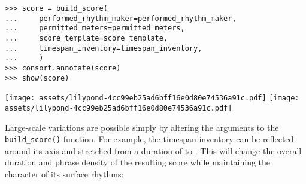 \begin{abjadbookoutput}
\begin{singlespacing}
\vspace{-0.5\baselineskip}
\begin{verbatim}
>>> score = build_score(
...     performed_rhythm_maker=performed_rhythm_maker,
...     permitted_meters=permitted_meters,
...     score_template=score_template,
...     timespan_inventory=timespan_inventory,
...     )
>>> consort.annotate(score)
>>> show(score)
\end{verbatim}
\noindent\texttt{[image: assets/lilypond-4cc99eb25ad6bff16e0d80e74536a91c.pdf]}
\newline
\newline
\noindent\texttt{[image: assets/lilypond-4cc99eb25ad6bff16e0d80e74536a91c.pdf]}
\end{singlespacing}
\end{abjadbookoutput}

\noindent Large-scale variations are possible simply by altering the arguments
to the \texttt{build\_score()} function. For example, the timespan inventory
can be reflected around its axis and stretched from a duration of 
to . This will change the overall duration and phrase density of
the resulting score while maintaining the character of its surface rhythms:

\begin{comment}
<abjad>[stylesheet=../consort-small.ily]
multiplier = Duration(24, 4) / Duration(19, 4)
timespan_inventory = timespan_inventory.reflect()
timespan_inventory = timespan_inventory.stretch(multiplier)
timespan_inventory = timespan_inventory.round_offsets(Duration(1, 8))
show(timespan_inventory, key='voice_name')
score = build_score(
    performed_rhythm_maker=performed_rhythm_maker,
    permitted_meters=permitted_meters,
    score_template=score_template,
    timespan_inventory=timespan_inventory,
    )
consort.annotate(score)
show(score)
</abjad>
\end{comment}

